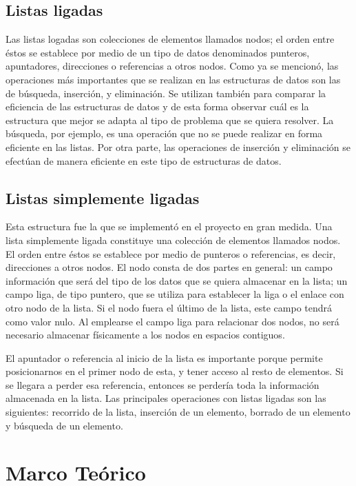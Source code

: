 \documentclass[11pt]{article}
\begin{document}
\subsection{Listas ligadas}
\par
Las listas logadas son colecciones de elementos llamados nodos; el orden entre éstos se establece por medio de un tipo de datos denominados punteros, apuntadores, direcciones o referencias a otros nodos. Como ya se mencionó, las operaciones más importantes que se realizan en las estructuras de datos son las de búsqueda, inserción, y eliminación. Se utilizan también para comparar la eficiencia de las estructuras de datos y de esta forma observar cuál es la estructura que mejor se adapta al tipo de problema que se quiera resolver. La búsqueda, por ejemplo, es una operación que no se puede realizar en forma eficiente en las listas. Por otra parte, las operaciones de inserción y eliminación se efectúan de manera eficiente en este tipo de estructuras de datos.
\subsection{Listas simplemente ligadas}
\par
Esta estructura fue la que se implementó en el proyecto en gran medida. Una lista simplemente ligada constituye una colección de elementos llamados nodos. El orden entre éstos se establece por medio de punteros o referencias, es decir, direcciones a otros nodos. El nodo consta de dos partes en general: un campo información que será del tipo de los datos que se quiera almacenar en la lista; un campo liga, de tipo puntero, que se utiliza para establecer la liga o el enlace con otro nodo de la lista. Si el nodo fuera el último de la lista, este campo tendrá como valor nulo. Al emplearse el campo liga para relacionar dos nodos, no será necesario almacenar físicamente a los nodos en espacios contiguos. 
\par
El apuntador o referencia al inicio de la lista es importante porque permite posicionarnos en el primer nodo de esta, y tener acceso al resto de elementos. Si se llegara a perder esa referencia, entonces se perdería toda la información almacenada en la lista. Las principales operaciones con listas ligadas son las siguientes: recorrido de la lista, inserción de un elemento, borrado de un elemento y búsqueda de un elemento.

\section{Marco Teórico}
\end{document}
